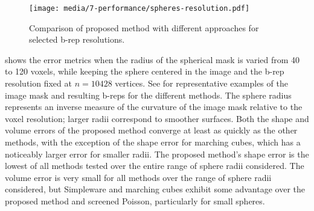 \begin{figure}[t!]
	\centering
	\texttt{[image: media/7-performance/spheres-resolution.pdf]}
	\caption{Comparison of proposed method with different approaches for selected b-rep resolutions.}
	\label{fig:demos1}
\end{figure}

 shows the error metrics when the radius of the spherical mask is varied from 40 to 120 voxels, while keeping the sphere centered in the image and the b-rep resolution fixed at $n = 10428$ vertices. See  for representative examples of the image mask and resulting b-reps for the different methods. The sphere radius represents an inverse measure of the curvature of the image mask relative to the voxel resolution; larger radii correspond to smoother surfaces. Both the shape and volume errors of the proposed method converge at least as quickly as the other methods, with the exception of the shape error for marching cubes, which has a noticeably larger error for smaller radii. The proposed method's shape error is the lowest of all methods tested over the entire range of sphere radii considered.  The volume error is very small for all methods over the range of sphere radii considered, but Simpleware and marching cubes exhibit some advantage over the proposed method and screened Poisson, particularly for small spheres.

